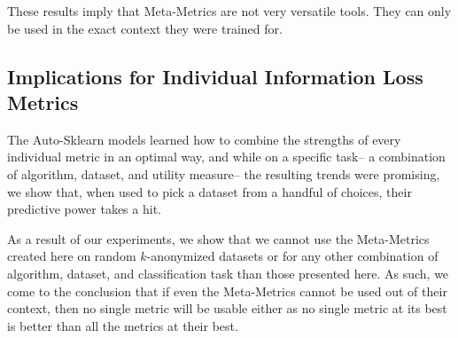 \begin{table}[h]
\centerfloat
{}
\caption{A table to show how often, when using the Meta-Metric trained for one utility measure, we could predict the most useful of two $k$-anonymous datasets according to another utility measure. We find that the Meta-Metrics do not transfer well across dataset, as no score is above a 73\%.}
\label{tab:1v1_cross_measures}
\end{table}

These results imply that Meta-Metrics are not very versatile tools. They can only be used in the exact context they were trained for.



\subsection{Implications for Individual Information Loss Metrics}
The Auto-Sklearn models learned how to combine the strengths of every individual metric in an optimal way, and while on a specific task-- a combination of algorithm, dataset, and utility measure-- the resulting trends were promising, we show that, when used to pick a dataset from a handful of choices, their predictive power takes a hit.

As a result of our experiments, we show that we cannot use the Meta-Metrics created here on random $k$-anonymized datasets or for any other combination of algorithm, dataset, and classification task than those presented here. As such, we come to the conclusion that if even the Meta-Metrics cannot be used out of their context, then no single metric will be usable either as no single metric at its best is better than all the metrics at their best.